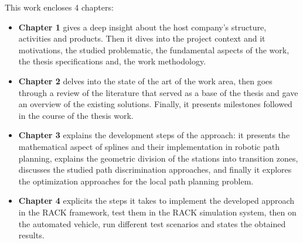 \noindent This work encloses 4 chapters: 
\begin{itemize}
    \item \textbf{Chapter 1} gives a deep insight about the host company’s structure, activities and products. 
    Then it dives into the project context and it motivations, the studied problematic, the fundamental aspects of 
    the work, the thesis specifications and, the work methodology. 
    \item \textbf{Chapter 2} delves into the state of the art of the work area, then goes through a review of the 
    literature that served as a base of the thesis and gave an overview of the existing solutions. Finally, 
    it presents milestones followed in the course of the thesis work. 
    \item \textbf{Chapter 3} explains the development steps of the approach: it presents the mathematical aspect of 
    splines and their implementation in robotic path planning, explains the geometric division of the stations 
    into transition zones, discusses the studied path discrimination approaches, and finally it explores the optimization 
    approaches for the local path planning problem. 
    \item \textbf{Chapter 4} explicits the steps it takes to implement the developed approach in the RACK framework, 
    test them in the RACK simulation system, then on the automated vehicle, run different test scenarios and states 
    the obtained results. 
\end{itemize}

\newpage
\thispagestyle{intro}